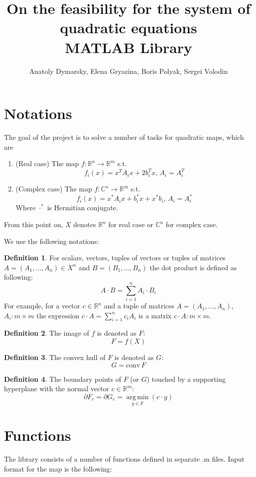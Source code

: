 \documentclass[a4paper]{article}
\title{On the feasibility for the system of quadratic equations\\MATLAB Library}
\date{}
\author{Anatoly Dymarsky, Elena Gryazina, Boris Polyak, Sergei Volodin}
\DeclareMathOperator*{\argmin}{arg\,min}
\newcommand{\conv}{\mbox{conv}\,}
\theoremstyle{definition}
\newtheorem{definition}{Definition}[section]
\begin{document}
\maketitle
\section{Notations}
The goal of the project is to solve a number of tasks for quadratic maps, which are
\begin{enumerate}
\item (Real case) The map $f\colon \mathbb{R}^n\to\mathbb{R}^m$ s.t. $$f_i(x)=x^TA_ix+2b_i^Tx,\, A_i=A_i^T$$
\item (Complex case) The map $f\colon \mathbb{C}^n\to\mathbb{R}^m$ s.t. $$f_i(x)=x^*A_ix+b_i^*x+x^*b_i,\, A_i=A_i^*$$
Where $\cdot^*$ is Hermitian conjugate.
\end{enumerate}

From this point on, $X$ denotes $\mathbb{R}^n$ for real case or $\mathbb{C}^n$ for complex case.

We use the following notations:
\theoremstyle{definition}
\begin{definition} For scalars, vectors, tuples of vectors or tuples of matrices $A=(A_1,...,A_n)\in X^n$ and $B=(B_1,...,B_n)$ the dot product is defined as following: $$A\cdot B=\sum\limits_{i=1}^nA_i\cdot B_i$$
For example, for a vector $c\in \mathbb{R}^n$ and a tuple of matrices $A=(A_1,...,A_n)$, $A_i\colon m\times m$ the expression $c\cdot A=\sum\limits_{i=1}^nc_iA_i$ is a matrix $c\cdot A\colon m\times m$.
\end{definition}
\begin{definition} The image of $f$ is denoted as $F$:
	$$F=f(X)$$
\end{definition}
\begin{definition} The convex hull of $F$ is denoted as $G$:
	$$G=\conv F$$
\end{definition}
\begin{definition} The boundary points of $F$ (or $G$) touched by a supporting hyperplane with the normal vector $c\in\mathbb{R}^m$:
	$$\partial F_c=\partial G_c=\argmin\limits_{y\in F}(c\cdot y)$$
\end{definition}
\section{Functions}
The library consists of a number of functions defined in separate .m files. Input format for the map is the following: 
\end{document}

